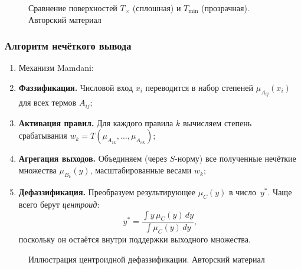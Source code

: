 \begin{figure}[H]
\centering
{}
\caption{Сравнение поверхностей $T_{\times}$ (сплошная) и $T_{\min}$ (прозрачная). Авторский материал}
\label{fig:tnorm_surface}
\end{figure}

\subsubsection{Алгоритм нечёткого вывода}
\begin{enumerate}[itemsep=0.3em]
  \item[] Механизм Mamdani:
  \item \textbf{Фаззификация.}  
        Числовой вход $x_i$ переводится
        в набор степеней $\mu_{A_{ij}}(x_i)$
        для всех термов $A_{ij}$;
  \item \textbf{Активация правил.}  
        Для каждого правила $k$ вычисляем
        степень срабатывания
        \(
          w_k = T(\mu_{A_{1k}},\dots,\mu_{A_{nk}});
        \)
  \item \textbf{Агрегация выходов.}  
        Объединяем (через $S$-норму) все
        полученные нечёткие множества
        \(
          \mu_{B_k}(y)
        \),
        масштабированные весами $w_k$;
  \item \textbf{Дефаззификация.}  
        Преобразуем результирующее
        $\mu_C(y)$ в число~$y^\ast$.
        Чаще всего берут \emph{центроид}:
        \[
          y^\ast =
          \dfrac{\int y\,\mu_C(y)\,dy}{\int \mu_C(y)\,dy},
        \]
        поскольку он остаётся
        внутри поддержки выходного множества.
\end{enumerate}

\begin{figure}[H]
\centering
{}
\caption{Иллюстрация центроидной дефаззификации. Авторский материал}
\label{fig:centroid}
\end{figure}


